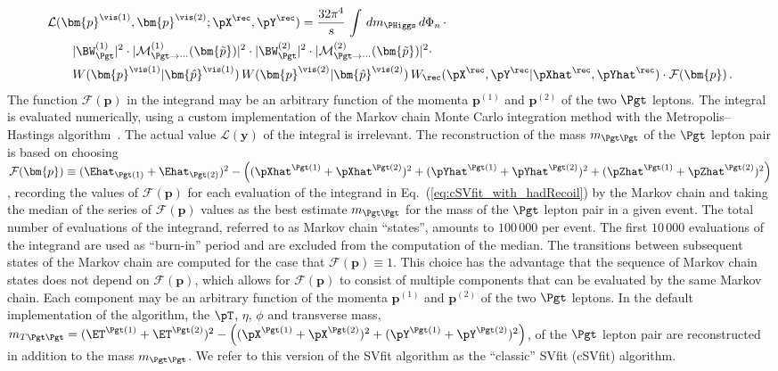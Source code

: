 \begin{align}
& \mathcal{L}(\bm{p}^{\vis(1)},\bm{p}^{\vis(2)};\pX^{\rec},\pY^{\rec}) 
= \frac{32\pi^{4}}{s} \, \int \, dm_{\PHiggs} \, d\Phi_{n} \, \cdot \hspace{2cm} \nonumber \\
& \qquad \vert \BW^{(1)}_{\Pgt} \vert^{2} \cdot \vert \mathcal{M}^{(1)}_{\Pgt\to\cdots}(\bm{\tilde{p}}) \vert^{2} 
 \cdot \vert \BW^{(2)}_{\Pgt} \vert^{2} \cdot \vert \mathcal{M}^{(2)}_{\Pgt\to\cdots}(\bm{\tilde{p}}) \vert^{2} \cdot \nonumber \\
& \qquad W(\bm{p}^{\vis(1)}|\bm{\hat{p}}^{\vis(1)}) \, W(\bm{p}^{\vis(2)}|\bm{\hat{p}}^{\vis(2)}) \, W_{\rec}( \pX^{\rec},\pY^{\rec} | \pXhat^{\rec},\pYhat^{\rec} ) \cdot \mathcal{F}(\bm{p}) \, .
\label{eq:cSVfit_with_hadRecoil}
\end{align}
The function $\mathcal{F}(\bm{p})$ in the integrand may be an arbitrary function of the momenta $\bm{p}^{(1)}$ and $\bm{p}^{(2)}$ of the two $\Pgt$ leptons.
The integral is evaluated numerically, using a custom implementation of the Markov chain Monte Carlo integration method with the Metropolis--Hastings algorithm~\cite{Metropolis_Hastings}.
The actual value $\mathcal{L}(\bm{y})$ of the integral is irrelevant.
The reconstruction of the mass $m_{\Pgt\Pgt}$ of the $\Pgt$ lepton pair is based on choosing 
$\mathcal{F}(\bm{p}) \equiv (\Ehat_{\Pgt(1)} + \Ehat_{\Pgt(2)})^{2} 
 - \left( (\pXhat^{\Pgt(1)} + \pXhat^{\Pgt(2)})^{2} + (\pYhat^{\Pgt(1)} + \pYhat^{\Pgt(2)})^{2} + (\pZhat^{\Pgt(1)} + \pZhat^{\Pgt(2)})^{2} \right)$,
recording the values of $\mathcal{F}(\bm{p})$ for each evaluation of the integrand in Eq.~(\ref{eq:cSVfit_with_hadRecoil}) by the Markov chain
and taking the median of the series of $\mathcal{F}(\bm{p})$ values
as the best estimate $m_{\Pgt\Pgt}$ for the mass of the $\Pgt$ lepton pair in a given event.
The total number of evaluations of the integrand, referred to as Markov chain ``states'',  
amounts to $100\,000$ per event. The first $10\,000$ evaluations of the integrand are used as ``burn-in'' period and are excluded from the computation of the median.
The transitions between subsequent states of the Markov chain are computed for the case that $\mathcal{F}(\bm{p}) \equiv 1$.
This choice has the advantage that the sequence of Markov chain states does not depend on $\mathcal{F}(\bm{p})$,
which allows for $\mathcal{F}(\bm{p})$ to consist of multiple components that can be evaluated by the same Markov chain.
Each component may be an arbitrary function of the momenta $\bm{p}^{(1)}$ and $\bm{p}^{(2)}$ of the two $\Pgt$ leptons.
In the default implementation of the algorithm,
the $\pT$, $\eta$, $\phi$ and transverse mass, $m_{T\Pgt\Pgt} = (\ET^{\Pgt(1)} + \ET^{\Pgt(2)})^{2} 
 - \left( (\pX^{\Pgt(1)} + \pX^{\Pgt(2)})^{2} + (\pY^{\Pgt(1)} + \pY^{\Pgt(2)})^{2} \right)$, of the $\Pgt$ lepton pair
are reconstructed in addition to the mass $m_{\Pgt\Pgt}$.
We refer to this version of the SVfit algorithm as the ``classic'' SVfit (cSVfit) algorithm.

